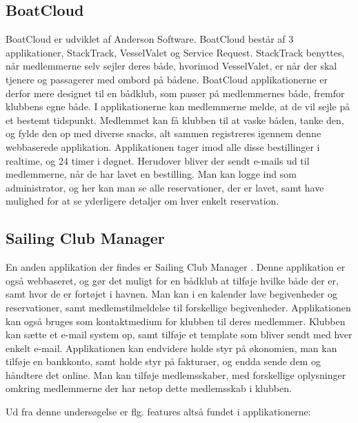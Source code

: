 \subsection*{BoatCloud}

BoatCloud er udviklet af Anderson Software. \citep{BoatCloud} 
BoatCloud består af 3 applikationer, StackTrack, VesselValet og Service Request. 
StackTrack benyttes, når medlemmerne selv sejler deres både, hvorimod VesselValet, er når der skal tjenere og passagerer med ombord på bådene. 
BoatCloud applikationerne er derfor mere designet til
en bådklub, som passer på medlemmernes både, fremfor klubbens egne både. 
I applikationerne kan medlemmerne melde, at de vil sejle på et bestemt tidspunkt. 
Medlemmet kan få klubben til at vaske båden, tanke den, og
fylde den op med diverse snacks, alt sammen registreres igennem denne webbaserede applikation. 
Applikationen tager imod alle disse bestillinger i realtime, og 24 timer i døgnet. 
Herudover bliver der sendt e-mails ud til medlemmerne, når de har lavet en bestilling. 
Man kan logge ind som administrator, og her kan man se alle reservationer, der er lavet, samt have mulighed for at se yderligere detaljer om hver enkelt reservation.


\subsection*{Sailing Club Manager}

En anden applikation der findes er Sailing Club Manager \citep{SailClub}. 
Denne applikation er også webbaseret, og gør det muligt for en bådklub at tilføje hvilke både der er, samt hvor de er fortøjet i havnen. 
Man kan i en kalender lave begivenheder og reservationer, samt medlemstilmeldelse til forskellige begivenheder. Applikationen kan også bruges som kontaktmedium for klubben til deres medlemmer. 
Klubben kan sætte et e-mail system op, samt tilføje et template som bliver sendt med hver enkelt e-mail. Applikationen kan endvidere holde styr på økonomien, man kan tilføje en bankkonto, samt  holde styr på fakturaer, og endda sende dem og håndtere det online. 
Man kan tilføje medlemsskaber, med forskellige oplysninger omkring medlemmerne der har netop dette medlemsskab i klubben.

Ud fra denne undersøgelse er flg. features altså fundet i applikationerne:

